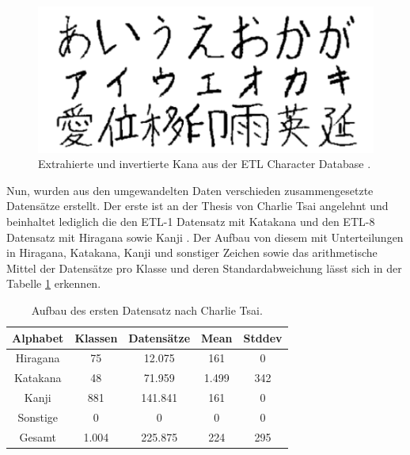 \documentclass[twoside,a4paper]{IEEEtran}
\begin{document}
\begin{figure}[!htb]
	\includegraphics[width=\columnwidth]{kana}
	\caption{Extrahierte und invertierte Kana aus der ETL Character Database \cite[S.1]{RHC}.}
	\label{kana}
\end{figure}

Nun, wurden aus den umgewandelten Daten verschieden zusammengesetzte Datensätze erstellt. Der erste ist an der Thesis von Charlie Tsai angelehnt und beinhaltet lediglich die den ETL-1 Datensatz mit Katakana und den ETL-8 Datensatz mit Hiragana sowie Kanji \cite[S.3]{RHC}. Der Aufbau von diesem mit Unterteilungen in Hiragana, Katakana, Kanji und sonstiger Zeichen sowie das arithmetische Mittel der Datensätze pro Klasse und deren Standardabweichung lässt sich in der Tabelle \ref{data_tsai} erkennen.
\begin{table}[!htb]
	\caption{Aufbau des ersten Datensatz nach Charlie Tsai.}
	\label{data_tsai}
	\centering
	\begin{tabular}{|c|c|c|c|c|}
		\hline
		Alphabet & Klassen & Datensätze & Mean & Stddev\\
		\hline
		\hline
		Hiragana & 75 & 12.075 & 161 & 0\\
		\hline 
		Katakana & 48 & 71.959 & 1.499 & 342\\
		\hline
		Kanji & 881 & 141.841 & 161 & 0\\
		\hline
		Sonstige & 0 & 0 & 0 & 0\\
		\hline
		\hline
		Gesamt & 1.004 & 225.875 & 224 & 295\\
		\hline
	\end{tabular}
\end{table}
\end{document}
